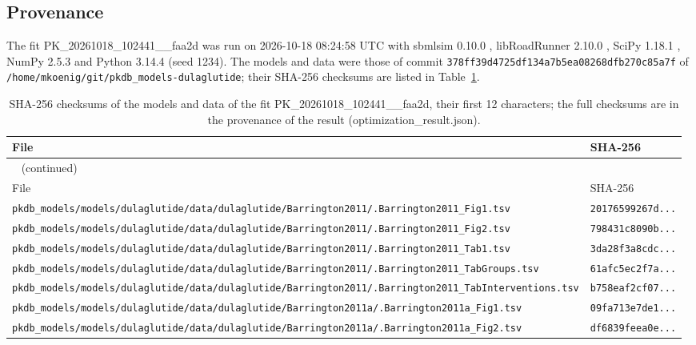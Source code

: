 \subsection{Provenance}

The fit PK\_20261018\_102441\_\_faa2d was run on 2026-10-18 08:24:58 UTC with sbmlsim 0.10.0 \cite{Koenig2026_sbmlsim}, libRoadRunner 2.10.0 \cite{Welsh2023}, SciPy 1.18.1 \cite{Virtanen2020}, NumPy 2.5.3 \cite{Harris2020} and Python 3.14.4 (seed 1234). The models and data were those of commit \texttt{378ff39d4725df134a7b5ea08268dfb270c85a7f} of \texttt{/home/mkoenig/git/pkdb\_models-dulaglutide}; their SHA-256 checksums are listed in Table~\ref{tab:checksums:PK_20261018_102441__faa2d}.

\begin{longtable}{ll}
\caption{SHA-256 checksums of the models and data of the fit PK\_20261018\_102441\_\_faa2d, their first 12 characters; the full checksums are in the provenance of the result (optimization\_result.json).}\label{tab:checksums:PK_20261018_102441__faa2d} \\
\toprule
File & SHA-256 \\
\midrule
\endfirsthead
\multicolumn{2}{l}{\small\tablename~\thetable{} (continued)} \\
\toprule
File & SHA-256 \\
\midrule
\endhead
\bottomrule
\endlastfoot
\texttt{pkdb\_models/models/dulaglutide/data/dulaglutide/Barrington2011/.Barrington2011\_Fig1.tsv} & \texttt{20176599267d...} \\
\texttt{pkdb\_models/models/dulaglutide/data/dulaglutide/Barrington2011/.Barrington2011\_Fig2.tsv} & \texttt{798431c8090b...} \\
\texttt{pkdb\_models/models/dulaglutide/data/dulaglutide/Barrington2011/.Barrington2011\_Tab1.tsv} & \texttt{3da28f3a8cdc...} \\
\texttt{pkdb\_models/models/dulaglutide/data/dulaglutide/Barrington2011/.Barrington2011\_TabGroups.tsv} & \texttt{61afc5ec2f7a...} \\
\texttt{pkdb\_models/models/dulaglutide/data/dulaglutide/Barrington2011/.Barrington2011\_TabInterventions.tsv} & \texttt{b758eaf2cf07...} \\
\texttt{pkdb\_models/models/dulaglutide/data/dulaglutide/Barrington2011a/.Barrington2011a\_Fig1.tsv} & \texttt{09fa713e7de1...} \\
\texttt{pkdb\_models/models/dulaglutide/data/dulaglutide/Barrington2011a/.Barrington2011a\_Fig2.tsv} & \texttt{df6839feea0e...} \\

\end{longtable}

